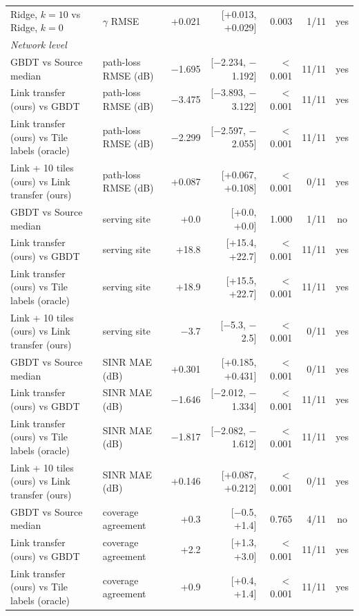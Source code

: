 \begin{tabular}{llrrrrc}
Ridge, $k{=}10$ vs Ridge, $k{=}0$ & $\gamma$ RMSE & +0.021 & [+0.013, +0.029] & 0.003 & 1/11 & yes \\
\multicolumn{7}{l}{\emph{Network level}} \\
GBDT vs Source median & path-loss RMSE (dB) & \ensuremath{-}1.695 & [\ensuremath{-}2.234, \ensuremath{-}1.192] & $<$0.001 & 11/11 & yes \\
Link transfer (ours) vs GBDT & path-loss RMSE (dB) & \ensuremath{-}3.475 & [\ensuremath{-}3.893, \ensuremath{-}3.122] & $<$0.001 & 11/11 & yes \\
Link transfer (ours) vs Tile labels (oracle) & path-loss RMSE (dB) & \ensuremath{-}2.299 & [\ensuremath{-}2.597, \ensuremath{-}2.055] & $<$0.001 & 11/11 & yes \\
Link + 10 tiles (ours) vs Link transfer (ours) & path-loss RMSE (dB) & +0.087 & [+0.067, +0.108] & $<$0.001 & 0/11 & yes \\
GBDT vs Source median & serving site & +0.0 & [+0.0, +0.0] & 1.000 & 1/11 & no \\
Link transfer (ours) vs GBDT & serving site & +18.8 & [+15.4, +22.7] & $<$0.001 & 11/11 & yes \\
Link transfer (ours) vs Tile labels (oracle) & serving site & +18.9 & [+15.5, +22.7] & $<$0.001 & 11/11 & yes \\
Link + 10 tiles (ours) vs Link transfer (ours) & serving site & \ensuremath{-}3.7 & [\ensuremath{-}5.3, \ensuremath{-}2.5] & $<$0.001 & 0/11 & yes \\
GBDT vs Source median & SINR MAE (dB) & +0.301 & [+0.185, +0.431] & $<$0.001 & 0/11 & yes \\
Link transfer (ours) vs GBDT & SINR MAE (dB) & \ensuremath{-}1.646 & [\ensuremath{-}2.012, \ensuremath{-}1.334] & $<$0.001 & 11/11 & yes \\
Link transfer (ours) vs Tile labels (oracle) & SINR MAE (dB) & \ensuremath{-}1.817 & [\ensuremath{-}2.082, \ensuremath{-}1.612] & $<$0.001 & 11/11 & yes \\
Link + 10 tiles (ours) vs Link transfer (ours) & SINR MAE (dB) & +0.146 & [+0.087, +0.212] & $<$0.001 & 0/11 & yes \\
GBDT vs Source median & coverage agreement & +0.3 & [\ensuremath{-}0.5, +1.4] & 0.765 & 4/11 & no \\
Link transfer (ours) vs GBDT & coverage agreement & +2.2 & [+1.3, +3.0] & $<$0.001 & 11/11 & yes \\
Link transfer (ours) vs Tile labels (oracle) & coverage agreement & +0.9 & [+0.4, +1.4] & $<$0.001 & 11/11 & yes \\

\end{tabular}
